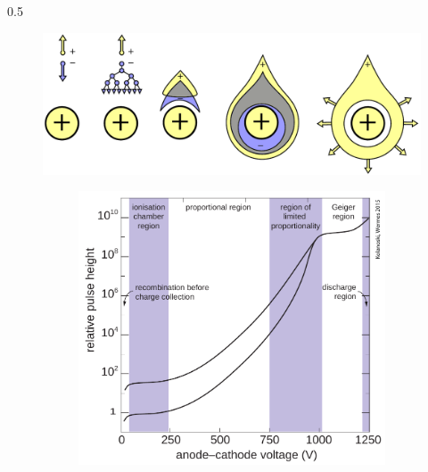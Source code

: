 \documentclass{beamer}
\begin{document}
\begin{frame}
\begin{columns}
\begin{column}{0.5\framewidth}
\begin{figure}[!h]
                \label{fig:drifttube}
                \end{figure}
                \begin{figure}[!h]
                    \centering
                    \includegraphics[width =0.9\columnwidth]{figures/png/Screenshot_20240330_182509.png}
                  \label{fig:avalanche}
                  \begin{figure}[!h]
                    \centering
                    \includegraphics[width =0.75\columnwidth]{figures/png/Screenshot_20240330_203416.png}
                    \label{fig:gaseous}
                    \end{figure}
                \end{figure}
        \end{column}
    \end{columns}
\end{frame}
\end{document}
